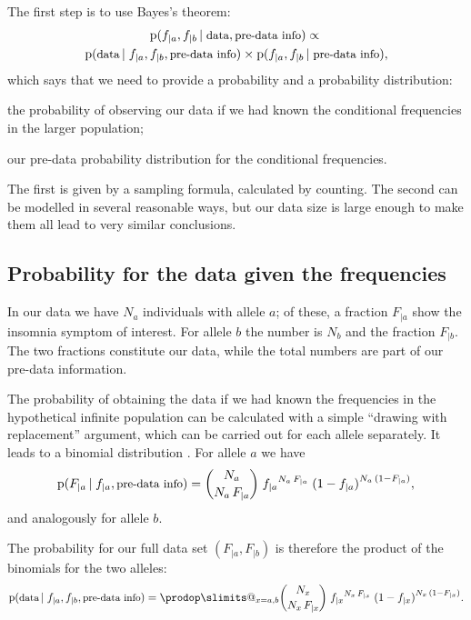 \documentclass[\ifafour a4paper,12pt,\else a5paper,10pt,\fi%
onecolumn,oneside,article,%
british%
]{memoir}
\makeatletter
\theoremstyle{remark}
\theoremstyle{innote}
\def\prod{\DOTSI\prodop\slimits@}
\newcommand*{\pf}{\mathrm{p}}%
\renewcommand*{\|}[1][]{\nonscript\,#1\vert\nonscript\;\mathopen{}}
\newcommand*{\sect}{\S}%
\newcommand*{\chap}{ch.}%
\newcommand*{\ptext}[1]{\text{\small #1}}
\newcommand*{\yI}{I}
\newcommand*{\ya}{a}
\newcommand*{\yb}{b}
\makeatother
\begin{document}
The first step is to use Bayes's theorem:
\begin{multline}
  \label{eq:intuitive_Bayes}
  \pf(f_{|\ya}, f_{|\yb} \| \ptext{data}, \ptext{pre-data info})
  \propto{}\\
  \pf(\ptext{data} \| f_{|\ya}, f_{|\yb}, \ptext{pre-data info})
  \times
  \pf(f_{|\ya}, f_{|\yb} \| \ptext{pre-data info}),
\end{multline}
which says that we need to provide a probability and a probability
distribution:
\begin{enumerate*}[label=(\roman*)]
\item the probability of observing our data if we had known the
  conditional frequencies in the larger population; \item our pre-data
  probability distribution for the conditional frequencies.
\end{enumerate*}
The first is given by a sampling formula, calculated by counting. The
second can be modelled in several reasonable ways, but our data size is
large enough to make them all lead to very similar conclusions.

\subsection{Probability for the data given the frequencies}
\label{sec:p_data_from_freqs}

In our data we have $N_{\ya}$ individuals with allele $\ya$; of these, a
fraction $F_{|\ya}$ show the insomnia symptom of interest. For allele $\yb$
the number is $N_{\yb}$ and the fraction $F_{|\yb}$. The two fractions constitute
our data, while the total numbers are part of our pre-data information.

The probability of obtaining the data if we had known the frequencies in
the hypothetical infinite population can be calculated with a simple
\enquote{drawing with replacement} argument, which can be carried out for
each allele separately. It leads to a binomial distribution
\cites[\chap~3]{jaynes1994_r2003}[\sect~4.6]{ross1976_r2010}[\sect~VI.2]{feller1950_r1968}.
For allele $\ya$ we have
\begin{equation}
  \label{eq:sampling_belief}
  \pf( F_{|\ya} \| f_{|\ya}, \ptext{pre-data info})
  =
\binom{N_{\ya}}{N_{\ya}\,F_{|\ya}}\;  {f_{|\ya}}^{N_{\ya}\,F_{|\ya}} \;
  {(1-f_{|\ya})}^{N_{\ya}\,(1-F_{|\ya})},
\end{equation}
and analogously for allele $\yb$.

The probability for our full data set $(F_{|\ya},F_{|\yb})$ is therefore
the product of the binomials for the two alleles:
\begin{equation}
  \label{eq:sampling_belief_combined}
  \pf(\ptext{data} \|  f_{|\ya},f_{|\yb}, \ptext{pre-data info})
  =
 \prod_{x=\ya,\yb} \binom{N_{x}}{N_{x}\,F_{|x}}\;{f_{|x}}^{N_{x}\,F_{|x}} \;
  {(1-f_{|x})}^{N_{x}\,(1-F_{|x})}.
\end{equation}
\end{document}
